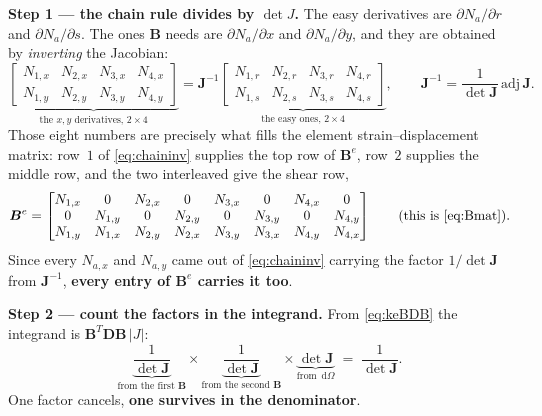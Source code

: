\documentclass[11pt]{article}
\newcommand{\dOm}{\,\mathrm{d}\Omega}
\begin{document}
\medskip
\noindent
\textbf{Step 1 --- the chain rule divides by $\det J$.} The easy derivatives
are $\partial N_{a}/\partial r$ and $\partial N_{a}/\partial s$. The ones
$\bm{B}$ needs are $\partial N_{a}/\partial x$ and $\partial N_{a}/\partial y$,
and they are obtained by \emph{inverting} the Jacobian:
\begin{equation}\label{eq:chaininv}
  \underbrace{\begin{bmatrix}
    N_{1,x} & N_{2,x} & N_{3,x} & N_{4,x}\\
    N_{1,y} & N_{2,y} & N_{3,y} & N_{4,y}
  \end{bmatrix}}_{\text{the }x,y\text{ derivatives, }2\times4}
  =\bm{J}^{-1}
  \underbrace{\begin{bmatrix}
    N_{1,r} & N_{2,r} & N_{3,r} & N_{4,r}\\
    N_{1,s} & N_{2,s} & N_{3,s} & N_{4,s}
  \end{bmatrix}}_{\text{the easy ones, }2\times4},
  \qquad
  \bm{J}^{-1}=\frac{1}{\det\bm{J}}\,\mathrm{adj}\,\bm{J} .
\end{equation}
Those eight numbers are precisely what fills the element strain--displacement
matrix: row~$1$ of \eqref{eq:chaininv} supplies the top row of $\bm{B}^{e}$,
row~$2$ supplies the middle row, and the two interleaved give the shear row,
\begin{equation}\label{eq:Befilled}
  \bm{B}^{e}=
  \begin{bmatrix}
    N_{1,x} & 0       & N_{2,x} & 0       & N_{3,x} & 0       & N_{4,x} & 0\\
    0       & N_{1,y} & 0       & N_{2,y} & 0       & N_{3,y} & 0       & N_{4,y}\\
    N_{1,y} & N_{1,x} & N_{2,y} & N_{2,x} & N_{3,y} & N_{3,x} & N_{4,y} & N_{4,x}
  \end{bmatrix}
  \qquad\text{(this is \eqref{eq:Bmat})} .
\end{equation}
Since every $N_{a,x}$ and $N_{a,y}$ came out of \eqref{eq:chaininv} carrying
the factor $1/\det\bm{J}$ from $\bm{J}^{-1}$, \textbf{every entry of
$\bm{B}^{e}$ carries it too}.

\medskip
\noindent
\textbf{Step 2 --- count the factors in the integrand.} From
\eqref{eq:keBDB} the integrand is $\bm{B}^{T}\bm{D}\bm{B}\,|J|$:
\[
  \underbrace{\frac{1}{\det\bm{J}}}_{\text{from the first }\bm{B}}\times
  \underbrace{\frac{1}{\det\bm{J}}}_{\text{from the second }\bm{B}}\times
  \underbrace{\det\bm{J}}_{\text{from }\dOm}
  \;=\;\frac{1}{\det\bm{J}} .
\]
One factor cancels, \textbf{one survives in the denominator}.
\end{document}
